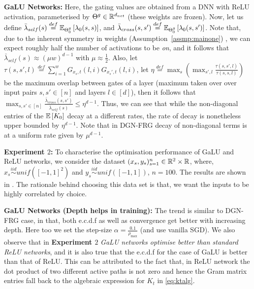 \textbf{GaLU Networks:} Here, the gating values are obtained from a DNN with ReLU activation, parameterised by ${\Theta}^g\in \mathbb{R}^{d_{net}}$ (these weights are frozen). Now, let us define $\bar{\lambda}_{self}(s)\stackrel{def}=\mathbb{E}_{{\Theta}^g_0}\left[\lambda_0(s,s)\right]$, and $\bar{\lambda}_{cross}(s,s')\stackrel{def}= \mathbb{E}_{{\Theta}^g_0}\left[\lambda_0(s,s')\right]$. Note that, due to the inherent symmetry in weights (Assumption~\ref{assmp:mainone}) , we can expect roughly half the number of activations to be \emph{on}, and it follows that $\bar{\lambda}_{self}(s)\approx (\mu w)^{d-1}$ with $\mu\approx\frac12$. Also, let $\tau(s,s',l)\stackrel{def}=\sum_{i=1}^w G_{x_s,t}(l,i)G_{x_s',t}(l,i)$,  let $\eta\stackrel{def}=\max_s\left(\max_{s',l} \frac{\tau(s,s',l)}{\tau(s,s,l)}\right)$ be the maximum overlap between gates of a layer (maximum taken over over input pairs $s,s'\in[n]$ and layers $l\in [d]$), then it follows that $\max_{s,s'\in [n]} \frac{\bar{\lambda}_{cross}(s,s')}{\bar{\lambda}_{self}(s)}\leq \eta^{d-1}$. Thus,  we can see that while the non-diagonal entries of the $\mathbb{E}\left[K_0\right]$ decay at a different rates, the rate of decay is nonetheless upper bounded by $\eta^{d-1}$. Note that in DGN-FRG decay of non-diagonal terms is at a uniform rate given by $\mu^{d-1}$.



\textbf{Experiment $2$:} To characterise the optimisation performance of GaLU and ReLU networks, we consider the dataset $(x_s,y_s)_{s=1}^{n}\in \mathbb{R}^2\times \mathbb{R}$, where, $x_s\stackrel{iid}\sim unif(\left[-1,1\right]^2)$ and $y_s\stackrel{iid}\sim unif([-1,1])$, $n=100$. The results are shown in . The rationale behind choosing this data set is that, we want the inputs to be highly correlated by choice.
 
 \textbf{GaLU Networks (Depth helps in training): }The trend is similar to DGN-FRG case, in that, both e.c.d.f as well as convergence get better with increasing depth. Here too we set the step-size $\alpha=\frac{0.1}{\rho_{\max}}$ (and use vanilla SGD). We also observe that in \textbf{Experiment $2$} \emph{GaLU networks optimise better than standard ReLU networks}, and it is also true that the e.c.d.f for the case of GaLU is better than that of ReLU. This can be attributed to the fact that, in ReLU network the dot product of two different active paths is not zero and hence the Gram matrix entries fall back to the algebraic expression for $K_t$ in \eqref{eq:ktalg}.


